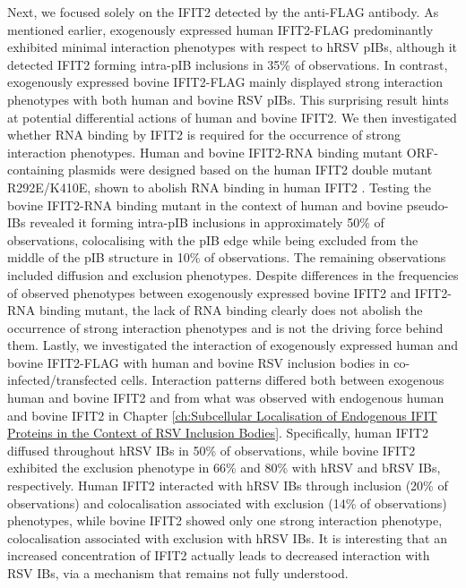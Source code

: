 Next, we focused solely on the IFIT2 detected by the anti-FLAG antibody. As mentioned earlier, exogenously expressed human IFIT2-FLAG predominantly exhibited minimal interaction phenotypes with respect to hRSV pIBs, although it detected IFIT2 forming intra-pIB inclusions in 35\% of observations. In contrast, exogenously expressed bovine IFIT2-FLAG mainly displayed strong interaction phenotypes with both human and bovine RSV pIBs. This surprising result hints at potential differential actions of human and bovine IFIT2. We then investigated whether RNA binding by IFIT2 is required for the occurrence of strong interaction phenotypes. Human and bovine IFIT2-RNA binding mutant ORF-containing plasmids were designed based on the human IFIT2 double mutant R292E/K410E, shown to abolish RNA binding in human IFIT2 \cite{Yang2012CrystalMechanisms}. Testing the bovine IFIT2-RNA binding mutant in the context of human and bovine pseudo-IBs revealed it forming intra-pIB inclusions in approximately 50\% of observations, colocalising with the pIB edge while being excluded from the middle of the pIB structure in 10\% of observations. The remaining observations included diffusion and exclusion phenotypes. Despite differences in the frequencies of observed phenotypes between exogenously expressed bovine IFIT2 and IFIT2-RNA binding mutant, the lack of RNA binding clearly does not abolish the occurrence of strong interaction phenotypes and is not the driving force behind them. Lastly, we investigated the interaction of exogenously expressed human and bovine IFIT2-FLAG with human and bovine RSV inclusion bodies in co-infected/transfected cells. Interaction patterns differed both between exogenous human and bovine IFIT2 and from what was observed with endogenous human and bovine IFIT2 in Chapter \ref{ch:Subcellular Localisation of Endogenous IFIT Proteins in the Context of RSV Inclusion Bodies}. Specifically, human IFIT2 diffused throughout hRSV IBs in 50\% of observations, while bovine IFIT2 exhibited the exclusion phenotype in 66\% and 80\% with hRSV and bRSV IBs, respectively. Human IFIT2 interacted with hRSV IBs through inclusion (20\% of observations) and colocalisation associated with exclusion (14\% of observations) phenotypes, while bovine IFIT2 showed only one strong interaction phenotype, colocalisation associated with exclusion with hRSV IBs. It is interesting that an increased concentration of IFIT2 actually leads to decreased interaction with RSV IBs, via a mechanism that remains not fully understood.


